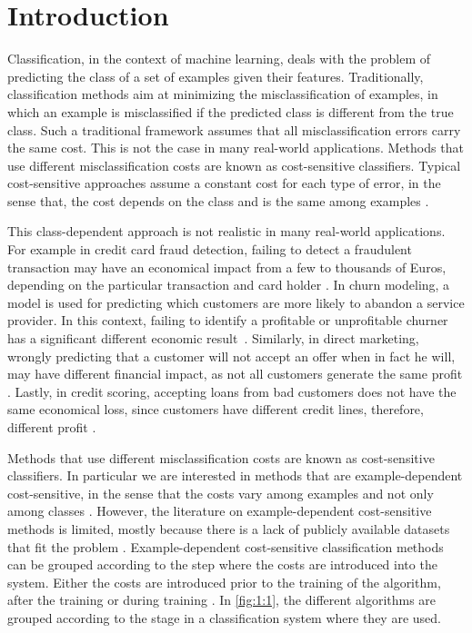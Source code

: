 \chapter{Introduction}\label{ch:1}

  Classification, in the context of machine learning, deals with the problem of 
  predicting the class of a set of examples given their features. Traditionally, classification 
  methods aim at minimizing the misclassification of examples, in which an example is 
  misclassified if the predicted class is different from the true class. Such a traditional 
  framework assumes that all misclassification errors carry the same cost. This is not the case in 
  many real-world applications. Methods that use different misclassification costs are known as 
  cost-sensitive classifiers. Typical cost-sensitive approaches assume a constant cost for each 
  type of error, in the sense that, the cost depends on the class and is the same among examples 
  \citep{Elkan2001,Kim2012}. 
  
  This class-dependent approach is not realistic in many real-world applications. For 
  example in credit card fraud detection, failing to detect a fraudulent transaction may have an 
  economical impact from a few to thousands of Euros, depending on the particular transaction and 
  card holder \citep{Ngai2011a}. In churn modeling, a model is used for predicting which
  customers are more likely to abandon a service provider. In this context, failing to identify a 
  profitable or unprofitable churner has a significant different economic 
  result~\citep{Verbraken2013}. Similarly, in direct marketing, wrongly predicting that a customer 
  will not accept an offer when in fact he will, may have different financial impact, as not all 
  customers generate the same profit \citep{Zadrozny2003}. Lastly, in credit scoring, accepting 
  loans from bad customers does not have the same economical loss, since customers have different 
  credit lines, therefore, different profit \citep{Verbraken2014}.
  
  Methods that use different misclassification costs are known as cost-sensitive classifiers. In 
  particular we are interested in methods that are example-dependent cost-sensitive, in the sense 
  that the costs vary among examples and not only among classes \citep{Elkan2001}. However, the 
  literature on example-dependent cost-sensitive methods is limited, mostly because there is a 
  lack of publicly available datasets that fit the problem \citep{MacAodha2013}.
  Example-dependent cost-sensitive classification methods can be grouped according to the step 
  where the costs are introduced into the system. Either the costs are introduced prior to the 
  training of the algorithm, after the training or during training \citep{Wang2013}. In 
  \figurename{ \ref{fig:1:1}}, the different algorithms are grouped according to the stage in a 
  classification system where they are used.
  
